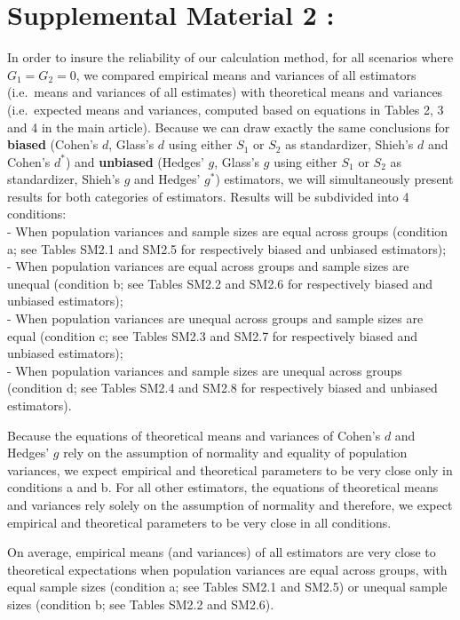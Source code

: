 \documentclass[
  english,
  man,mask,floatsintext]{apa6}
\begin{document}
\newpage

\hypertarget{supplemental-material-2}{%
\section{Supplemental Material 2 :}\label{supplemental-material-2}}

In order to insure the reliability of our calculation method, for all scenarios where \(G_1=G_2=0\), we compared empirical means and variances of all estimators (i.e.~means and variances of all estimates) with theoretical means and variances (i.e.~expected means and variances, computed based on equations in Tables 2, 3 and 4 in the main article). Because we can draw exactly the same conclusions for \textbf{biased} (Cohen's \(d\), Glass's \(d\) using either \(S_1\) or \(S_2\) as standardizer, Shieh's \(d\) and Cohen's \(d^*\)) and \textbf{unbiased} (Hedges' \(g\), Glass's \(g\) using either \(S_1\) or \(S_2\) as standardizer, Shieh's \(g\) and Hedges' \(g^*\)) estimators, we will simultaneously present results for both categories of estimators. Results will be subdivided into 4 conditions:\\
- When population variances and sample sizes are equal across groups (condition a; see Tables SM2.1 and SM2.5 for respectively biased and unbiased estimators);\\
- When population variances are equal across groups and sample sizes are unequal (condition b; see Tables SM2.2 and SM2.6 for respectively biased and unbiased estimators);\\
- When population variances are unequal across groups and sample sizes are equal (condition c; see Tables SM2.3 and SM2.7 for respectively biased and unbiased estimators);\\
- When population variances and sample sizes are unequal across groups (condition d; see Tables SM2.4 and SM2.8 for respectively biased and unbiased estimators).

Because the equations of theoretical means and variances of Cohen's \(d\) and Hedges' \(g\) rely on the assumption of normality and equality of population variances, we expect empirical and theoretical parameters to be very close only in conditions a and b. For all other estimators, the equations of theoretical means and variances rely solely on the assumption of normality and therefore, we expect empirical and theoretical parameters to be very close in all conditions.

On average, empirical means (and variances) of all estimators are very close to theoretical expectations when population variances are equal across groups, with equal sample sizes (condition a; see Tables SM2.1 and SM2.5) or unequal sample sizes (condition b; see Tables SM2.2 and SM2.6).
\end{document}
